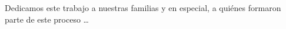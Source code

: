 \begin{dedicatoria} 

Dedicamos este trabajo a nuestras familias y en especial, a quiénes formaron parte de este proceso \dots

\end{dedicatoria}